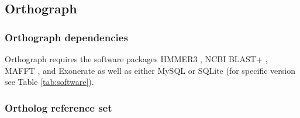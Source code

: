 \subsection{Orthograph}

\subsubsection{Orthograph dependencies}

Orthograph requires the software packages HMMER3 \citep{Eddy2011}, NCBI
BLAST+ \citep{Camacho2009}, MAFFT \citep{Katoh2013}, and Exonerate
\citep{Slater2005} as well as either MySQL or SQLite (for specific
version see Table \ref{tab:software}).

\subsubsection{Ortholog reference set}

